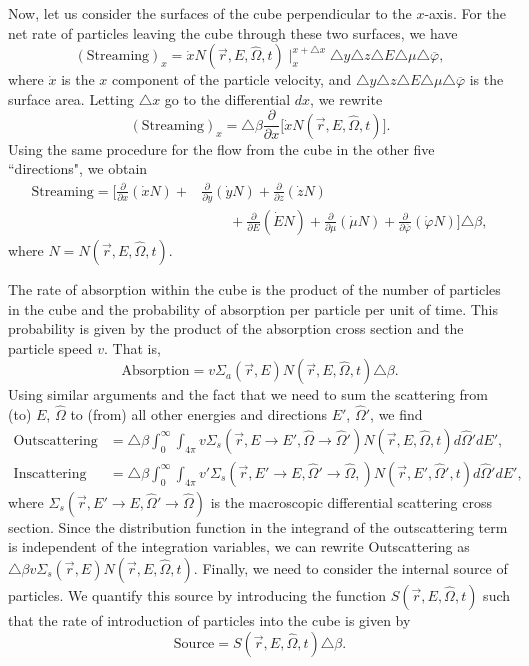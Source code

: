 \documentclass[12pt]{article}
\newcommand{\rvec}{\ensuremath{\vec{r}}}
\newcommand{\omvec}{\ensuremath{\hat{\Omega}}}
\begin{document}
 Now, let us consider the surfaces of the cube perpendicular to the $x$-axis. For the net rate
of particles leaving the cube through these two surfaces, we have
\begin{equation*}
(\textrm{Streaming})_x = \dot x N(\rvec,E,\omvec,t)\mid_x^{x+\triangle x}
\triangle y\triangle z\triangle E\triangle \mu\triangle \overline\varphi,
\end{equation*}
 where $\dot x$ is the $x$ component of the particle velocity,
and 
$\triangle y\triangle z\triangle E\triangle\mu\triangle \overline\varphi$ is the surface area. Letting $\triangle x$ go to
the differential $dx$, we rewrite
\begin{equation*}
(\textrm{Streaming})_x = \triangle \beta \frac{\partial}{\partial x}\big[
\dot x N(\rvec,E,\omvec,t)\big].
\end{equation*}
 Using the same procedure for the flow from the cube in the other five ``directions", we obtain
\begin{align*}
\textrm{Streaming} =
\bigg[ \frac{\partial}{\partial x}(\dot x N) + &
\frac{\partial}{\partial y}(\dot y N) +\frac{\partial}{\partial z}(\dot z N) \\
&\quad\quad + \frac{\partial}{\partial E}(\dot E N) + \frac{\partial}{\partial \mu}(\dot \mu N) +
\frac{\partial}{\partial \overline{\varphi}}(\dot \varphi N)\bigg] \triangle \beta,
\end{align*}
 where $N = N(\rvec,E,\omvec,t)$.


 The rate of absorption within the cube is the product of the number of particles in the cube
and the probability of absorption per particle per unit of time. This probability is given by
the product of the absorption cross section and the particle speed $v$. That is,
\begin{equation*}
\textrm{Absorption} = v\Sigma_a(\rvec,E)N(\rvec ,E,\omvec,t)\triangle \beta.
\end{equation*}
 Using similar arguments and the fact that we need to sum the scattering from (to) $E$,
$\omvec$ to (from) all other energies and directions $E'$, $\omvec'$, we find
\begin{align*}
\textrm{Outscattering} &= \triangle \beta \int_0^{\infty}\int_{4\pi}
v\Sigma_s(\rvec,E\rightarrow E', \omvec\rightarrow\omvec')N(\rvec,E,\omvec,t)d\omvec'dE', \\
\textrm{Inscattering} &= \triangle \beta \int_0^{\infty}\int_{4\pi}
v'\Sigma_s(\rvec,E'\rightarrow E, \omvec'\rightarrow\omvec,)N(\rvec,E',\omvec',t)d\omvec'dE',
\end{align*}
 where $\Sigma_s(\rvec,E'\rightarrow E, \omvec'\rightarrow\omvec)$ is the macroscopic differential scattering cross section. Since the distribution function in the integrand of the outscattering term is independent of
 the integration variables, we can rewrite
Outscattering as $\triangle \beta v\Sigma_s(\rvec,E)N(\rvec, E, \omvec,t).$
Finally, we need to consider the internal source of particles. We
quantify this source  by introducing the function $S(\rvec, E, \omvec, t)$
such that the rate of introduction of particles into the cube is given by
\begin{equation*}
\textrm{Source} = S(\rvec,E,\omvec,t)\triangle \beta.
\end{equation*}
\end{document}
